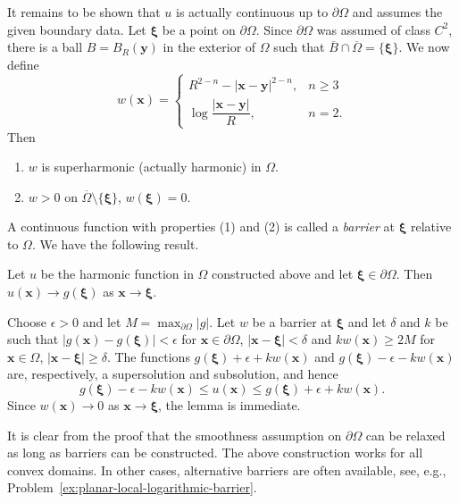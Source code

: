 It remains to be shown that $u$ is actually continuous up to $\partial\Omega$ and assumes the given boundary data. Let $\bm{\xi}$ be a point on $\partial\Omega$. Since $\partial\Omega$ was assumed of class $C^2$, there is a ball $B=B_R(\bm{y})$ in the exterior of $\Omega$ such that $\overline B\cap\overline\Omega=\{\bm{\xi}\}$. We now define
\begin{equation}\label{eq:perron-exterior-ball-barrier}
w(\bm{x})=\begin{cases}R^{2-n}-|\bm{x}-\bm{y}|^{2-n},&n\geq3\\\log\dfrac{|\bm{x}-\bm{y}|}{R},&n=2.\end{cases}
\end{equation}
Then
\begin{enumerate}
\item $w$ is superharmonic (actually harmonic) in $\Omega$.
\item $w>0$ on $\overline\Omega\setminus\{\bm{\xi}\}$, $w(\bm{\xi})=0$.
\end{enumerate}

A continuous function with properties (1) and (2) is called a \emph{barrier} at $\bm{\xi}$ relative to $\Omega$. We have the following result.

\begin{Lemma}
\label{lem:perron-boundary-continuity}
Let $u$ be the harmonic function in $\Omega$ constructed above and let $\bm{\xi}\in\partial\Omega$. Then $u(\bm{x})\to g(\bm{\xi})$ as $\bm{x}\to\bm{\xi}$.
\end{Lemma}

\begin{Proof}
Choose $\epsilon>0$ and let $M=\max_{\partial\Omega}|g|$. Let $w$ be a barrier at $\bm{\xi}$ and let $\delta$ and $k$ be such that $|g(\bm{x})-g(\bm{\xi})|<\epsilon$ for $\bm{x}\in\partial\Omega$, $|\bm{x}-\bm{\xi}|<\delta$ and $kw(\bm{x})\geq2M$ for $\bm{x}\in\Omega$, $|\bm{x}-\bm{\xi}|\geq\delta$. The functions $g(\bm{\xi})+\epsilon+kw(\bm{x})$ and $g(\bm{\xi})-\epsilon-kw(\bm{x})$ are, respectively, a supersolution and subsolution, and hence
\begin{equation}\label{eq:perron-barrier-boundary-comparison}
g(\bm{\xi})-\epsilon-kw(\bm{x})\leq u(\bm{x})\leq g(\bm{\xi})+\epsilon+kw(\bm{x}).
\end{equation}
Since $w(\bm{x})\to0$ as $\bm{x}\to\bm{\xi}$, the lemma is immediate.
\end{Proof}

It is clear from the proof that the smoothness assumption on $\partial\Omega$ can be relaxed as long as barriers can be constructed. The above construction works for all convex domains. In other cases, alternative barriers are often available, see, e.g., Problem~\ref{ex:planar-local-logarithmic-barrier}.


